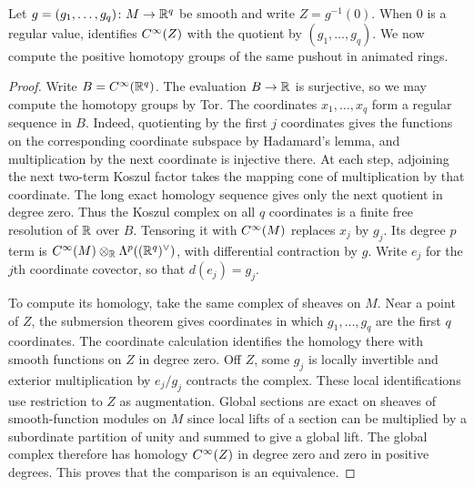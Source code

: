 Let $g=(g_1,\ldots,g_q)\colon M\to\mathbb{R}^q$ be smooth and write $Z=g^{-1}(0)$.
When $0$ is a regular value, 
identifies $C^\infty(Z)$ with the quotient by $(g_1,\ldots,g_q)$.
We now compute the positive homotopy groups of the same pushout in
animated rings.


\begin{proof}
  Write $B=C^\infty(\mathbb{R}^q)$. The evaluation $B\to\mathbb{R}$ is surjective,
  so we may compute the homotopy groups by Tor. The coordinates
  $x_1,\ldots,x_q$ form a regular sequence in $B$. Indeed, quotienting
  by the first $j$ coordinates gives the functions on the corresponding
  coordinate subspace by Hadamard's lemma, and multiplication by the
  next coordinate is injective there. At each step, adjoining the next
  two-term Koszul factor takes the mapping cone of multiplication by
  that coordinate. The long exact homology sequence gives only the
  next quotient in degree zero. Thus the Koszul complex on all $q$
  coordinates is a finite free resolution of $\mathbb{R}$ over $B$.
  Tensoring it with $C^\infty(M)$ replaces $x_j$ by $g_j$. Its degree
  $p$ term is $C^\infty(M)\otimes_{\mathbb{R}}\Lambda^p((\mathbb{R}^q)^\vee)$, with
  differential contraction by $g$. Write $e_j$ for the $j$th coordinate
  covector, so that $d(e_j)=g_j$.

  To compute its homology, take the same complex of sheaves on $M$.
  Near a point of $Z$, the submersion theorem gives coordinates in
  which $g_1,\ldots,g_q$ are the first $q$ coordinates. The coordinate
  calculation identifies the homology there with smooth functions on
  $Z$ in degree zero. Off $Z$, some $g_j$ is locally invertible and
  exterior multiplication by $e_j/g_j$ contracts the complex.
  These local identifications use restriction to $Z$ as augmentation.
  Global sections are exact on sheaves of smooth-function modules on
  $M$ since local lifts of a section can be multiplied by a subordinate
  partition of unity and summed to give a global lift. The global
  complex therefore has homology $C^\infty(Z)$ in degree zero and zero
  in positive degrees. This proves that the comparison is an
  equivalence.
\end{proof}

